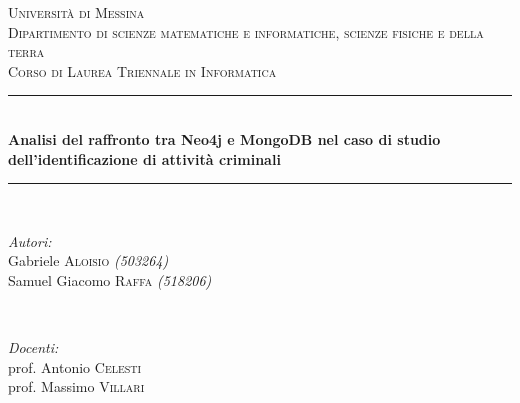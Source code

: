 \lstset{style=mystyle}


\begin{titlepage}

\newcommand{\HRule}{\rule{\linewidth}{0.5mm}} %

\center %
 

\textsc{\LARGE Università di Messina}\\[1.5cm] %
\textsc{\Large Dipartimento di scienze matematiche e informatiche, scienze fisiche e della terra}\\[0.5cm] %
\textsc{\large Corso di Laurea Triennale in Informatica}\\[0.5cm] %


\HRule \\[0.4cm]
{ \huge \bfseries Analisi del raffronto tra Neo4j e MongoDB nel caso di studio dell’identificazione di attività criminali}\\[0.4cm] %
\HRule \\[1.5cm]
 

\begin{minipage}{0.4\textwidth}
\begin{flushleft} \large
\emph{Autori:}\\
Gabriele \textsc{Aloisio} \textit{(503264)} \\
Samuel Giacomo \textsc{Raffa} \textit{(518206)} \\
\end{flushleft}
\end{minipage}
~
\begin{minipage}{0.4\textwidth}
\begin{flushright} \large
\emph{Docenti:} \\
prof. Antonio \textsc{Celesti} \\
prof. Massimo \textsc{Villari} \\
\end{flushright}
\end{minipage}\\[2cm]


\end{titlepage}
